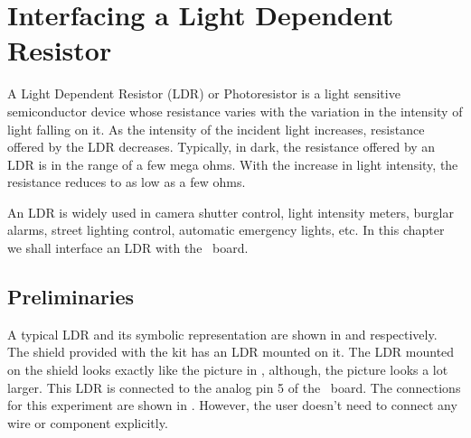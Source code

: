 \chapter {Interfacing a Light Dependent Resistor}
\thispagestyle{empty}
\label{ldr}

\newcommand{\LocLDRfig}{\Origin/user-code/ldr/figures}
\newcommand{\LocLDRscicode}{\Origin/user-code/ldr/scilab}
\newcommand{\LocLDRscibrief}[1]{{\tt
    \seqsplit{Origin/user-code/ldr/scilab/#1}},
see \fnrefp{fn:file-loc}}
\newcommand{\LocLDRardcode}{\Origin/user-code/ldr/arduino}
\newcommand{\LocLDRardbrief}[1]{{\tt
    \seqsplit{Origin/user-code/ldr/arduino/#1}},
see \fnrefp{fn:file-loc}}

\newcommand{\LocLDRpycode}{\Origin/user-code/ldr/python}
\newcommand{\LocLDRpybrief}[1]{{\tt \seqsplit{%
    Origin/user-code/ldr/python/#1}}, see \fnrefp{fn:file-loc}}

\newcommand{\LocLDRjuliacode}{\Origin/user-code/ldr/julia}
\newcommand{\LocLDRjuliabrief}[1]{{\tt \seqsplit{%
    Origin/user-code/ldr/julia/#1}}, see \fnrefp{fn:file-loc}}

\newcommand{\LocLDROpenModelicacode}{\Origin/user-code/ldr/OpenModelica}  %
\newcommand{\LocLDROpenModelicabrief}[1]{{\tt \seqsplit{%
    Origin/user-code/led/OpenModelica/#1}}, see \fnrefp{fn:file-loc}} %



A Light Dependent Resistor (LDR) or Photoresistor is a light sensitive
semiconductor device whose resistance varies with the variation in the
intensity of light falling on it. As the intensity of the incident
light increases, resistance offered by the LDR decreases. Typically,
in dark, the resistance offered by an LDR is in the range of a few
mega ohms. With the increase in light intensity, the resistance
reduces to as low as a few ohms.   

An LDR is widely used in camera shutter control, light intensity
meters, burglar alarms, street lighting control, automatic emergency
lights, etc. In this chapter we shall interface an LDR with the
\arduino\ board.  

\section{Preliminaries}
A typical LDR and its symbolic representation are shown in
 and  respectively. The shield
provided with the kit has an LDR mounted on it.  The LDR mounted on
the shield looks exactly like the picture in ,
although, the picture looks a lot larger.  This LDR is connected
to the analog pin 5 of the \arduino\ board. The connections for this
experiment are shown in . However, the user
doesn't need to connect any wire or component explicitly.

